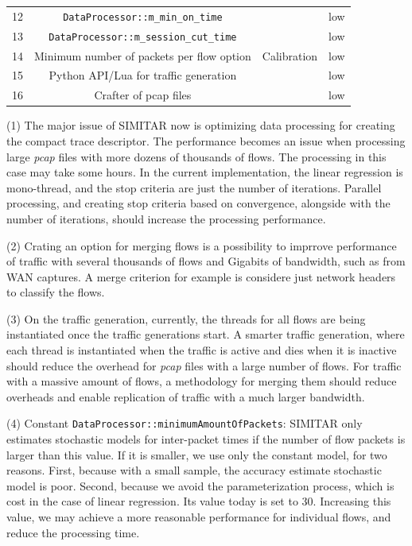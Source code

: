 \begin{table}[ht!]
\begin{tabular}{cccc}
		12                     & \texttt{DataProcessor::m\_min\_on\_time}                &                                                 & low                     \\
		13                     & \texttt{DataProcessor::m\_session\_cut\_time}           &                                                 & low                     \\
		14                     & Minimum number of packets per flow option                 & \multirow{-4}{*}{Calibration}  & low                     \\ \hline
		15 & Python API/Lua for traffic generation & & low \\
		16 & Crafter of  pcap files & & low \\
		\hline
	\end{tabular}
\end{table}





(1) The major issue of SIMITAR now is optimizing data processing for creating the compact trace descriptor. The performance becomes an issue when processing large \textit{pcap} files with more dozens of thousands of flows. The processing in this case may take some hours. In the current implementation, the linear regression is mono-thread, and the stop criteria are just the number of iterations. Parallel processing, and creating stop criteria based on convergence, alongside with the number of iterations, should increase the processing performance. 

(2) Crating an option for merging flows is a possibility to imprrove performance of traffic with several thousands of flows and Gigabits of bandwidth, such as from WAN captures. A merge criterion for example is considere just network headers to classify the flows. 

(3) On the traffic generation, currently, the threads for all flows are being instantiated once the traffic generations start. A smarter traffic generation, where each thread is instantiated when the traffic is active and dies when it is inactive should reduce the overhead for \textit{pcap} files with a large number of flows. For traffic with a massive amount of flows, a methodology for merging them should reduce overheads and enable replication of traffic with a much larger bandwidth. 


(4) Constant \texttt{DataProcessor::minimumAmountOfPackets}: SIMITAR only estimates stochastic models for inter-packet times if the number of flow packets is larger than this value. If it is smaller, we use only the constant model, for two reasons. First, because with a small sample, the accuracy estimate stochastic model is poor. Second, because we avoid the parameterization process, which is cost in the case of linear regression. Its value today is set to 30. Increasing this value, we may achieve a more reasonable performance for individual flows, and reduce the processing time. 


